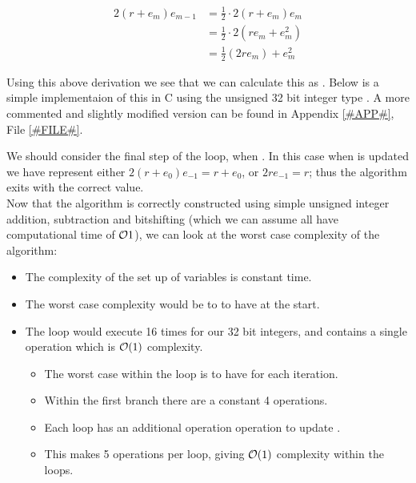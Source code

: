 \begin{displaymath}
\begin{align*}
	2(r+e_m)e_{m-1} 
		&= \frac{1}{2}\cdot 2(r+e_m)e_m\\
		&= \frac{1}{2}\cdot 2(re_m + e_m^2)\\
		&= \frac{1}{2}(2re_m) + e_m^2
\end{align*}
\end{displaymath}

Using this above derivation we see that we can calculate this as . Below is a simple implementaion of this in C using the unsigned 32 bit integer type . A more commented and slightly modified version can be found in Appendix \ref{#APP#}, File \ref{#FILE#}.


We should consider the final step of the loop, when . In this case when  is updated we have  represent either \(2(r+e_0)e_{-1} = r + e_0\), or \(2re_{-1} = r\); thus the algorithm exits with the correct value.\\

Now that the algorithm is correctly constructed using simple unsigned integer addition, subtraction and bitshifting (which we can assume all have computational time of \(\mathcal{O}{1}\)), we can look at the worst case complexity of the algorithm:

\begin{itemize}
\item The complexity of the set up of variables is constant time.
\item The worst case complexity would be to to have  at the start.
\item The loop would execute 16 times for our 32 bit integers, and contains a single operation which is \(\mathcal{O}(1)\) complexity.
\begin{itemize}
	\item The worst case within the loop is to have  for each iteration.
	\item Within the first  branch there are a constant 4 operations.
	\item Each loop has an additional operation operation to update .
	\item This makes 5 operations per loop, giving \(\mathcal{O}(1)\) complexity within the loops.
\end{itemize}
\end{itemize}

